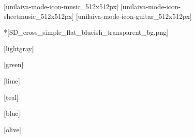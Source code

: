 
\newcommand{\subbooktitle}{o Livro Verde}





              [unilaiva-mode-icon-music_512x512px]%
              [unilaiva-mode-icon-sheetmusic_512x512px]%
              [unilaiva-mode-icon-guitar_512x512px]
  \imprintpage

  \toc

  \setcounter{chapter}{0}

  *[SD_cross_simple_flat_blueish_transparent_bg.png]
    

  [lightgray]
    \begin{songs}{}
      
    \end{songs}

  [green]
    \begin{songs}{}
      
    \end{songs}

  [lime]
    \begin{songs}{}
      
    \end{songs}

  [teal]
    \begin{songs}{}
      
    \end{songs}

  [blue]
    \begin{songs}{}
      
    \end{songs}

  [olive]
    \begin{songs}{}
      
    \end{songs}

